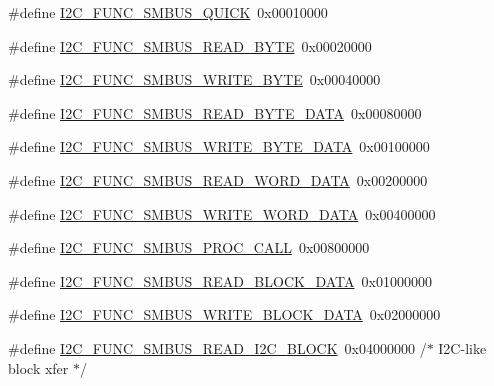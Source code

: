 \begin{DoxyCompactItemize}
\item 
\#define \hyperlink{i2c-tools-3_81_81_2include_2linux_2i2c-dev_8h_a4cf424f52753c3afe4ee9713c96358a2}{I2\+C\+\_\+\+F\+U\+N\+C\+\_\+\+S\+M\+B\+U\+S\+\_\+\+Q\+U\+I\+C\+K}~0x00010000
\item 
\#define \hyperlink{i2c-tools-3_81_81_2include_2linux_2i2c-dev_8h_a2aea3a65daa2b1734e85d5c63b9e9672}{I2\+C\+\_\+\+F\+U\+N\+C\+\_\+\+S\+M\+B\+U\+S\+\_\+\+R\+E\+A\+D\+\_\+\+B\+Y\+T\+E}~0x00020000
\item 
\#define \hyperlink{i2c-tools-3_81_81_2include_2linux_2i2c-dev_8h_a0a0e43b21d3085e3a00300f41ccf156d}{I2\+C\+\_\+\+F\+U\+N\+C\+\_\+\+S\+M\+B\+U\+S\+\_\+\+W\+R\+I\+T\+E\+\_\+\+B\+Y\+T\+E}~0x00040000
\item 
\#define \hyperlink{i2c-tools-3_81_81_2include_2linux_2i2c-dev_8h_a5645b268c2303289fdf043c3a035bf8d}{I2\+C\+\_\+\+F\+U\+N\+C\+\_\+\+S\+M\+B\+U\+S\+\_\+\+R\+E\+A\+D\+\_\+\+B\+Y\+T\+E\+\_\+\+D\+A\+T\+A}~0x00080000
\item 
\#define \hyperlink{i2c-tools-3_81_81_2include_2linux_2i2c-dev_8h_ac4186861a5c7f01d45e1f4ecba20334c}{I2\+C\+\_\+\+F\+U\+N\+C\+\_\+\+S\+M\+B\+U\+S\+\_\+\+W\+R\+I\+T\+E\+\_\+\+B\+Y\+T\+E\+\_\+\+D\+A\+T\+A}~0x00100000
\item 
\#define \hyperlink{i2c-tools-3_81_81_2include_2linux_2i2c-dev_8h_a1e313c48fbaba109e4b42b615c806459}{I2\+C\+\_\+\+F\+U\+N\+C\+\_\+\+S\+M\+B\+U\+S\+\_\+\+R\+E\+A\+D\+\_\+\+W\+O\+R\+D\+\_\+\+D\+A\+T\+A}~0x00200000
\item 
\#define \hyperlink{i2c-tools-3_81_81_2include_2linux_2i2c-dev_8h_a485634a989b0ace55940b8235785fcc5}{I2\+C\+\_\+\+F\+U\+N\+C\+\_\+\+S\+M\+B\+U\+S\+\_\+\+W\+R\+I\+T\+E\+\_\+\+W\+O\+R\+D\+\_\+\+D\+A\+T\+A}~0x00400000
\item 
\#define \hyperlink{i2c-tools-3_81_81_2include_2linux_2i2c-dev_8h_a86389b833643e6b1a050f6d4a7027873}{I2\+C\+\_\+\+F\+U\+N\+C\+\_\+\+S\+M\+B\+U\+S\+\_\+\+P\+R\+O\+C\+\_\+\+C\+A\+L\+L}~0x00800000
\item 
\#define \hyperlink{i2c-tools-3_81_81_2include_2linux_2i2c-dev_8h_a8a64d1f3b43e584549645386089fafe4}{I2\+C\+\_\+\+F\+U\+N\+C\+\_\+\+S\+M\+B\+U\+S\+\_\+\+R\+E\+A\+D\+\_\+\+B\+L\+O\+C\+K\+\_\+\+D\+A\+T\+A}~0x01000000
\item 
\#define \hyperlink{i2c-tools-3_81_81_2include_2linux_2i2c-dev_8h_a1f3f845fc6c212f6d54848cc71e752ab}{I2\+C\+\_\+\+F\+U\+N\+C\+\_\+\+S\+M\+B\+U\+S\+\_\+\+W\+R\+I\+T\+E\+\_\+\+B\+L\+O\+C\+K\+\_\+\+D\+A\+T\+A}~0x02000000
\item 
\#define \hyperlink{i2c-tools-3_81_81_2include_2linux_2i2c-dev_8h_a1e2efae197b3bcf4adb79b45065da621}{I2\+C\+\_\+\+F\+U\+N\+C\+\_\+\+S\+M\+B\+U\+S\+\_\+\+R\+E\+A\+D\+\_\+\+I2\+C\+\_\+\+B\+L\+O\+C\+K}~0x04000000 /$\ast$ I2\+C-\/like block xfer  $\ast$/

\end{DoxyCompactItemize}
